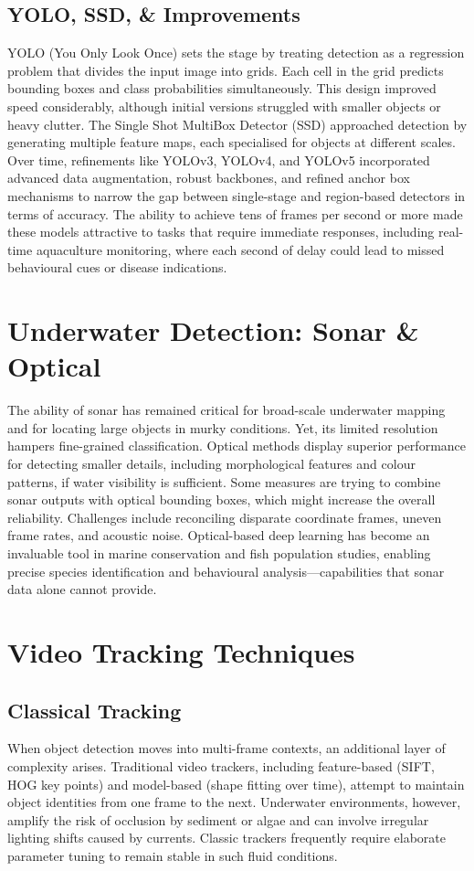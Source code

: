 \subsection{YOLO, SSD, \& Improvements}
YOLO (You Only Look Once) sets the stage by treating detection as a regression problem that divides the input image into grids. Each cell in the grid predicts bounding boxes and class probabilities simultaneously. This design improved speed considerably, although initial versions struggled with smaller objects or heavy clutter. The Single Shot MultiBox Detector (SSD) approached detection by generating multiple feature maps, each specialised for objects at different scales. Over time, refinements like YOLOv3, YOLOv4, and YOLOv5 incorporated advanced data augmentation, robust backbones, and refined anchor box mechanisms to narrow the gap between single-stage and region-based detectors in terms of accuracy. The ability to achieve tens of frames per second or more made these models attractive to tasks that require immediate responses, including real-time aquaculture monitoring, where each second of delay could lead to missed behavioural cues or disease indications.
\section{Underwater Detection: Sonar \& Optical}
The ability of sonar has remained critical for broad-scale underwater mapping and for locating large objects in murky conditions. Yet, its limited resolution hampers fine-grained classification. Optical methods display superior performance for detecting smaller details, including morphological features and colour patterns, if water visibility is sufficient. Some measures are trying to combine sonar outputs with optical bounding boxes, which might increase the overall reliability. Challenges include reconciling disparate coordinate frames, uneven frame rates, and acoustic noise. Optical-based deep learning has become an invaluable tool in marine conservation and fish population studies, enabling precise species identification and behavioural analysis—capabilities that sonar data alone cannot provide.

\section{Video Tracking Techniques}
\subsection{Classical Tracking}
When object detection moves into multi-frame contexts, an additional layer of complexity arises. Traditional video trackers, including feature-based (SIFT, HOG key points) and model-based (shape fitting over time), attempt to maintain object identities from one frame to the next. Underwater environments, however, amplify the risk of occlusion by sediment or algae and can involve irregular lighting shifts caused by currents. Classic trackers frequently require elaborate parameter tuning to remain stable in such fluid conditions.
